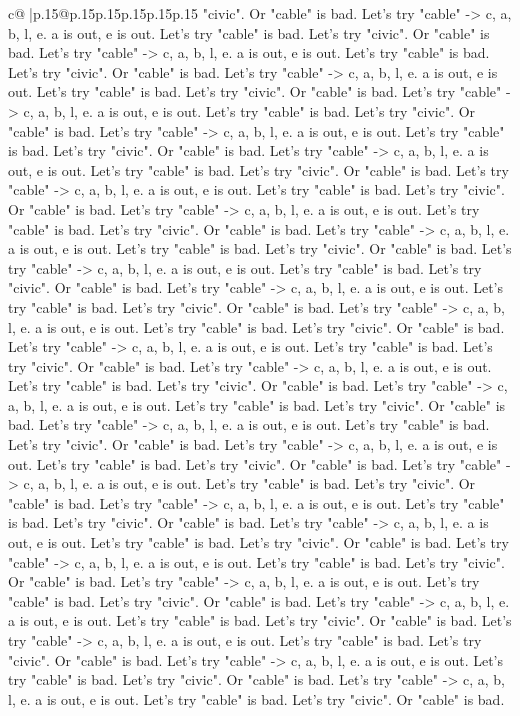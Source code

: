 \documentclass{article}
\begin{document}
{\begin{supertabular}{c@{$\;$}|p{.15\linewidth}@{}p{.15\linewidth}p{.15\linewidth}p{.15\linewidth}p{.15\linewidth}p{.15\linewidth}}
{{{"civic". Or "cable" is bad. Let's try "cable" {-}> c, a, b, l, e. a is out, e is out. Let's try "cable" is bad. Let's try "civic". Or "cable" is bad. Let's try "cable" {-}> c, a, b, l, e. a is out, e is out. Let's try "cable" is bad. Let's try "civic". Or "cable" is bad. Let's try "cable" {-}> c, a, b, l, e. a is out, e is out. Let's try "cable" is bad. Let's try "civic". Or "cable" is bad. Let's try "cable" {-}> c, a, b, l, e. a is out, e is out. Let's try "cable" is bad. Let's try "civic". Or "cable" is bad. Let's try "cable" {-}> c, a, b, l, e. a is out, e is out. Let's try "cable" is bad. Let's try "civic". Or "cable" is bad. Let's try "cable" {-}> c, a, b, l, e. a is out, e is out. Let's try "cable" is bad. Let's try "civic". Or "cable" is bad. Let's try "cable" {-}> c, a, b, l, e. a is out, e is out. Let's try "cable" is bad. Let's try "civic". Or "cable" is bad. Let's try "cable" {-}> c, a, b, l, e. a is out, e is out. Let's try "cable" is bad. Let's try "civic". Or "cable" is bad. Let's try "cable" {-}> c, a, b, l, e. a is out, e is out. Let's try "cable" is bad. Let's try "civic". Or "cable" is bad. Let's try "cable" {-}> c, a, b, l, e. a is out, e is out. Let's try "cable" is bad. Let's try "civic". Or "cable" is bad. Let's try "cable" {-}> c, a, b, l, e. a is out, e is out. Let's try "cable" is bad. Let's try "civic". Or "cable" is bad. Let's try "cable" {-}> c, a, b, l, e. a is out, e is out. Let's try "cable" is bad. Let's try "civic". Or "cable" is bad. Let's try "cable" {-}> c, a, b, l, e. a is out, e is out. Let's try "cable" is bad. Let's try "civic". Or "cable" is bad. Let's try "cable" {-}> c, a, b, l, e. a is out, e is out. Let's try "cable" is bad. Let's try "civic". Or "cable" is bad. Let's try "cable" {-}> c, a, b, l, e. a is out, e is out. Let's try "cable" is bad. Let's try "civic". Or "cable" is bad. Let's try "cable" {-}> c, a, b, l, e. a is out, e is out. Let's try "cable" is bad. Let's try "civic". Or "cable" is bad. Let's try "cable" {-}> c, a, b, l, e. a is out, e is out. Let's try "cable" is bad. Let's try "civic". Or "cable" is bad. Let's try "cable" {-}> c, a, b, l, e. a is out, e is out. Let's try "cable" is bad. Let's try "civic". Or "cable" is bad. Let's try "cable" {-}> c, a, b, l, e. a is out, e is out. Let's try "cable" is bad. Let's try "civic". Or "cable" is bad. Let's try "cable" {-}> c, a, b, l, e. a is out, e is out. Let's try "cable" is bad. Let's try "civic". Or "cable" is bad. Let's try "cable" {-}> c, a, b, l, e. a is out, e is out. Let's try "cable" is bad. Let's try "civic". Or "cable" is bad. Let's try "cable" {-}> c, a, b, l, e. a is out, e is out. Let's try "cable" is bad. Let's try "civic". Or "cable" is bad. Let's try "cable" {-}> c, a, b, l, e. a is out, e is out. Let's try "cable" is bad. Let's try "civic". Or "cable" is bad. Let's try "cable" {-}> c, a, b, l, e. a is out, e is out. Let's try "cable" is bad. Let's try "civic". Or "cable" is bad. Let's try "cable" {-}> c, a, b, l, e. a is out, e is out. Let's try "cable" is bad. Let's try "civic". Or "cable" is bad. Let's try "cable" {-}> c, a, b, l, e. a is out, e is out. Let's try "cable" is bad. Let's try "civic". Or "cable" is bad. }}}
\end{supertabular}}
\end{document}
